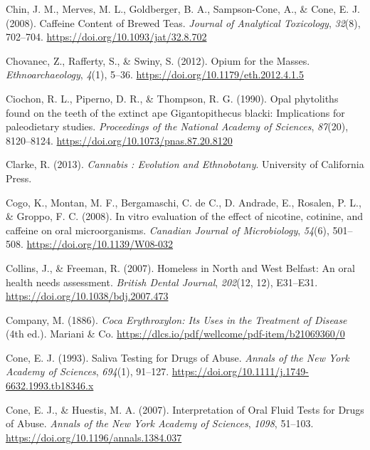 \documentclass[
  letterpaper,
]{book}
\newlength{\cslhangindent}
\newlength{\cslentryspacingunit} %
\newenvironment{CSLReferences}[2] %
 {%
  \setlength{\parindent}{0pt}
  \ifodd #1
  \let\oldpar\par
  \def\par{\hangindent=\cslhangindent\oldpar}
  \fi
  \setlength{\parskip}{#2\cslentryspacingunit}
 }%
 {}
\begin{document}
\begin{CSLReferences}{1}{0}
\leavevmode{}%
Chin, J. M., Merves, M. L., Goldberger, B. A., Sampson-Cone, A., \&
Cone, E. J. (2008). Caffeine {Content} of {Brewed Teas}. \emph{Journal
of Analytical Toxicology}, \emph{32}(8), 702--704.
\url{https://doi.org/10.1093/jat/32.8.702}

\leavevmode{}%
Chovanec, Z., Rafferty, S., \& Swiny, S. (2012). Opium for the {Masses}.
\emph{Ethnoarchaeology}, \emph{4}(1), 5--36.
\url{https://doi.org/10.1179/eth.2012.4.1.5}

\leavevmode{}%
Ciochon, R. L., Piperno, D. R., \& Thompson, R. G. (1990). Opal
phytoliths found on the teeth of the extinct ape {Gigantopithecus}
blacki: Implications for paleodietary studies. \emph{Proceedings of the
National Academy of Sciences}, \emph{87}(20), 8120--8124.
\url{https://doi.org/10.1073/pnas.87.20.8120}

\leavevmode{}%
Clarke, R. (2013). \emph{Cannabis : {Evolution} and {Ethnobotany}}.
{University of California Press}.

\leavevmode{}%
Cogo, K., Montan, M. F., Bergamaschi, C. de C., D. Andrade, E., Rosalen,
P. L., \& Groppo, F. C. (2008). In vitro evaluation of the effect of
nicotine, cotinine, and caffeine on oral microorganisms. \emph{Canadian
Journal of Microbiology}, \emph{54}(6), 501--508.
\url{https://doi.org/10.1139/W08-032}

\leavevmode{}%
Collins, J., \& Freeman, R. (2007). Homeless in {North} and {West
Belfast}: An oral health needs assessment. \emph{British Dental
Journal}, \emph{202}(12, 12), E31--E31.
\url{https://doi.org/10.1038/bdj.2007.473}

\leavevmode{}%
Company, M. (1886). \emph{Coca {Erythroxylon}: {Its Uses} in the
{Treatment} of {Disease}} (4th ed.). {Mariani \& Co.}
\url{https://dlcs.io/pdf/wellcome/pdf-item/b21069360/0}

\leavevmode{}%
Cone, E. J. (1993). Saliva {Testing} for {Drugs} of {Abuse}.
\emph{Annals of the New York Academy of Sciences}, \emph{694}(1),
91--127. \url{https://doi.org/10.1111/j.1749-6632.1993.tb18346.x}

\leavevmode{}%
Cone, E. J., \& Huestis, M. A. (2007). Interpretation of {Oral Fluid
Tests} for {Drugs} of {Abuse}. \emph{Annals of the New York Academy of
Sciences}, \emph{1098}, 51--103.
\url{https://doi.org/10.1196/annals.1384.037}


\end{CSLReferences}
\end{document}
